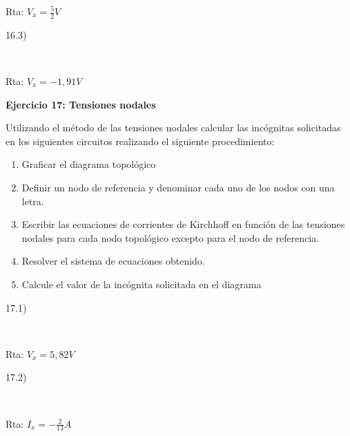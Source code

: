 \documentclass[11pt]{article}
\begin{document}
    Rta: \(V_x=\frac{5}{2}V\)

16.3)

    \begin{center}
    \end{center}
    { \hspace*{\fill} \\}
    
    Rta: \(V_x=-1,91V\)

\textbf{Ejercicio 17: Tensiones nodales}

Utilizando el método de las tensiones nodales calcular las incógnitas
solicitadas en los siguientes circuitos realizando el siguiente
procedimiento:

\begin{enumerate}
\def\labelenumi{\alph{enumi})}
\item
  Graficar el diagrama topológico
\item
  Definir un nodo de referencia y denominar cada uno de los nodos con
  una letra.
\item
  Escribir las ecuaciones de corrientes de Kirchhoff en función de las
  tensiones nodales para cada nodo topológico excepto para el nodo de
  referencia.
\item
  Resolver el sistema de ecuaciones obtenido.
\item
  Calcule el valor de la incógnita solicitada en el diagrama
\end{enumerate}

17.1)

    \begin{center}
    \end{center}
    { \hspace*{\fill} \\}
    
    Rta: \(V_x=5,82V\)

17.2)

    \begin{center}
    \end{center}
    { \hspace*{\fill} \\}
    
    Rta: \(I_x=-\frac{2}{13}A\)
\end{document}
